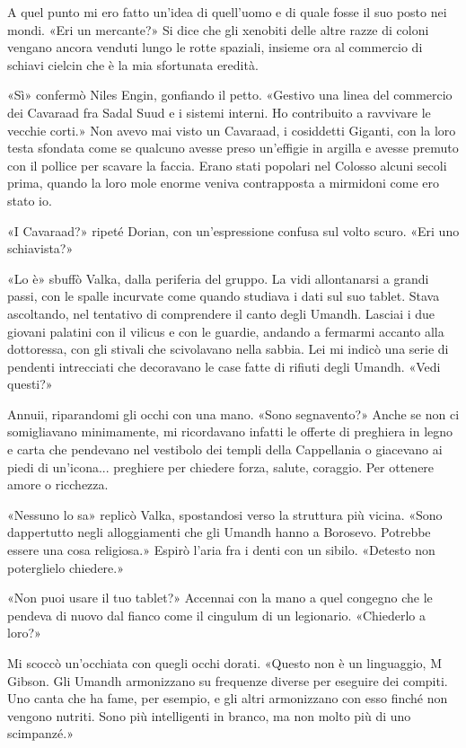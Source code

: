 A quel punto mi ero fatto un'idea di quell'uomo e di quale fosse il suo
posto nei mondi. «Eri un mercante?» Si dice che gli xenobiti delle altre
razze di coloni vengano ancora venduti lungo le rotte spaziali, insieme
ora al commercio di schiavi cielcin che è la mia sfortunata eredità.

«Sì» confermò Niles Engin, gonfiando il petto. «Gestivo una linea del
commercio dei Cavaraad fra Sadal Suud e i sistemi interni. Ho
contribuito a ravvivare le vecchie corti.» Non avevo mai visto un
Cavaraad, i cosiddetti Giganti, con la loro testa sfondata come se
qualcuno avesse preso un'effigie in argilla e avesse premuto con il
pollice per scavare la faccia. Erano stati popolari nel Colosso alcuni
secoli prima, quando la loro mole enorme veniva contrapposta a mirmidoni
come ero stato io.

«I Cavaraad?» ripeté Dorian, con un'espressione confusa sul volto scuro.
«Eri uno schiavista?»

«Lo è» sbuffò Valka, dalla periferia del gruppo. La vidi allontanarsi a
grandi passi, con le spalle incurvate come quando studiava i dati sul
suo tablet. Stava ascoltando, nel tentativo di comprendere il canto
degli Umandh. Lasciai i due giovani palatini con il vilicus e con le
guardie, andando a fermarmi accanto alla dottoressa, con gli stivali che
scivolavano nella sabbia. Lei mi indicò una serie di pendenti
intrecciati che decoravano le case fatte di rifiuti degli Umandh. «Vedi
questi?»

Annuii, riparandomi gli occhi con una mano. «Sono segnavento?» Anche se
non ci somigliavano minimamente, mi ricordavano infatti le offerte di
preghiera in legno e carta che pendevano nel vestibolo dei templi della
Cappellania o giacevano ai piedi di un'icona... preghiere per chiedere
forza, salute, coraggio. Per ottenere amore o ricchezza.

«Nessuno lo sa» replicò Valka, spostandosi verso la struttura più
vicina. «Sono dappertutto negli alloggiamenti che gli Umandh hanno a
Borosevo. Potrebbe essere una cosa religiosa.» Espirò l'aria fra i denti
con un sibilo. «Detesto non poterglielo chiedere.»

«Non puoi usare il tuo tablet?» Accennai con la mano a quel congegno che
le pendeva di nuovo dal fianco come il cingulum di un legionario.
«Chiederlo a loro?»

Mi scoccò un'occhiata con quegli occhi dorati. «Questo non è un
linguaggio, M Gibson. Gli Umandh armonizzano su frequenze diverse per
eseguire dei compiti. Uno canta che ha fame, per esempio, e gli altri
armonizzano con esso finché non vengono nutriti. Sono più intelligenti
in branco, ma non molto più di uno scimpanzé.»

